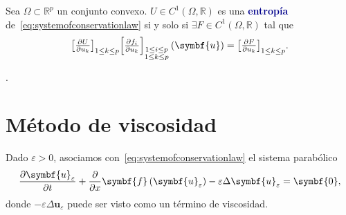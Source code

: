 \begin{definition}
	Sea $\Omega\subset\mathbb{R}^{p}$ un conjunto convexo.
	$U\in C^{1}\left(\Omega,\mathbb{R}\right)$ es una
	\textcolor{DarkBlue}{\bfseries entropía}
	de~\eqref{eq:systemofconservationlaw} si y solo si
	$\exists F\in C^{1}\left(\Omega,\mathbb{R}\right)$ tal que
	\begin{equation*}
		{\begin{bmatrix}
				\diffp{U}{u_{k}}
			\end{bmatrix}}_{1\leq k\leq p}
		{\begin{bmatrix}
				\diffp{f_{i}}{u_{k}}
			\end{bmatrix}}_{\substack{1\leq i\leq p\\1\leq k\leq p}}
		\left(\symbf{u}\right)=
		{\begin{bmatrix}
			\diffp{F}{u_{k}}
		\end{bmatrix}}_{1\leq k\leq p}.
	\end{equation*}
\end{definition}

\begin{example}[$p$-sistema]
	.
\end{example}

\section{Método de viscosidad}

Dado $\varepsilon>0$, asociamos
con~\eqref{eq:systemofconservationlaw} el sistema parabólico
\begin{equation}\label{eq:parabolicsystemofconservationlaw}
	\diffp{\symbf{u}_{\varepsilon}}{t}+
	\diffp{}{x}
	\symbf{f}
	\left(\symbf{u}_{\varepsilon}\right)-
	\varepsilon
	\Delta\symbf{u}_{\varepsilon}=
	\symbf{0},
\end{equation}
donde $-\varepsilon\Delta\symbf{u}_{\varepsilon}$ puede ser visto
como un término de viscosidad.

